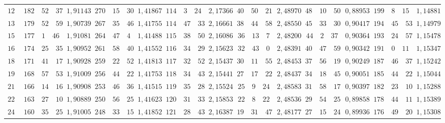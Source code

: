 \begin{landscape}
\begin{center}
\begin{tabular}{r|r|r|r|r|r|r|r|r|r|r|r|r}
\(120\) & \(182\quad 52\quad 37\) & \(1{,}91143\) & \(270\quad 15\quad 30\) & \(1{,}41867\) & \(114\quad 3\quad 24\) & \(2{,}17366\) & \(40\quad 50\quad 21\) & \(2{,}48970\) & \(48\quad 10\quad 50\) & \(0{,}88953\) & \(199\quad 8\quad 15\) & \(1{,}14881\) \\
\(135\) & \(179\quad 52\quad 59\) & \(1{,}90739\) & \(267\quad 35\quad 46\) & \(1{,}41755\) & \(114\quad 47\quad 33\) & \(2{,}16661\) & \(38\quad 44\quad 58\) & \(2{,}48550\) & \(45\quad 33\quad 30\) & \(0{,}90417\) & \(194\quad 45\quad 53\) & \(1{,}14979\) \\
\(150\) & \(177\quad 1\quad 46\) & \(1{,}91081\) & \(264\quad 47\quad 4\) & \(1{,}41488\) & \(115\quad 38\quad 50\) & \(2{,}16086\) & \(36\quad 13\quad 7\) & \(2{,}48200\) & \(44\quad 2\quad 37\) & \(0{,}90364\) & \(193\quad 24\quad 57\) & \(1{,}15478\) \\
\(165\) & \(174\quad 25\quad 35\) & \(1{,}90952\) & \(261\quad 58\quad 40\) & \(1{,}41552\) & \(116\quad 34\quad 29\) & \(2{,}15623\) & \(32\quad 43\quad 0\) & \(2{,}48391\) & \(40\quad 47\quad 59\) & \(0{,}90342\) & \(191\quad 0\quad 11\) & \(1{,}15347\) \\[3pt]
\(180\) & \(171\quad 41\quad 17\) & \(1{,}90928\) & \(259\quad 22\quad 52\) & \(1{,}41813\) & \(117\quad 32\quad 52\) & \(2{,}15437\) & \(30\quad 11\quad 55\) & \(2{,}48453\) & \(37\quad 56\quad 19\) & \(0{,}90249\) & \(187\quad 46\quad 37\) & \(1{,}15242\) \\
\(195\) & \(168\quad 57\quad 53\) & \(1{,}91009\) & \(256\quad 44\quad 22\) & \(1{,}41753\) & \(118\quad 34\quad 43\) & \(2{,}15441\) & \(27\quad 17\quad 22\) & \(2{,}48437\) & \(34\quad 18\quad 45\) & \(0{,}90051\) & \(185\quad 44\quad 22\) & \(1{,}15044\) \\
\(210\) & \(166\quad 14\quad 16\) & \(1{,}90908\) & \(253\quad 46\quad 36\) & \(1{,}41515\) & \(119\quad 35\quad 28\) & \(2{,}15524\) & \(25\quad 9\quad 24\) & \(2{,}48583\) & \(31\quad 58\quad 17\) & \(0{,}90397\) & \(182\quad 23\quad 10\) & \(1{,}15288\) \\
\(225\) & \(163\quad 27\quad 10\) & \(1{,}90889\) & \(250\quad 56\quad 25\) & \(1{,}41623\) & \(120\quad 31\quad 33\) & \(2{,}15853\) & \(22\quad 8\quad 22\) & \(2{,}48536\) & \(29\quad 54\quad 25\) & \(0{,}89858\) & \(178\quad 44\quad 11\) & \(1{,}15389\) \\[3pt]
\(240\) & \(160\quad 35\quad 25\) & \(1{,}91005\) & \(248\quad 33\quad 15\) & \(1{,}41852\) & \(121\quad 28\quad 43\) & \(2{,}16387\) & \(19\quad 31\quad 47\) & \(2{,}48177\) & \(27\quad 15\quad 24\) & \(0{,}89936\) & \(176\quad 49\quad 20\) & \(1{,}15308\) \\

\end{tabular}
\end{center}
\end{landscape}
